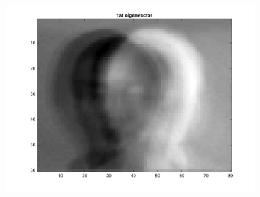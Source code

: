 \documentclass{article}
\begin{document}
\begin{figure}[H]

\includegraphics[scale =.5]{report7_1}
\end{figure}
\end{document}
